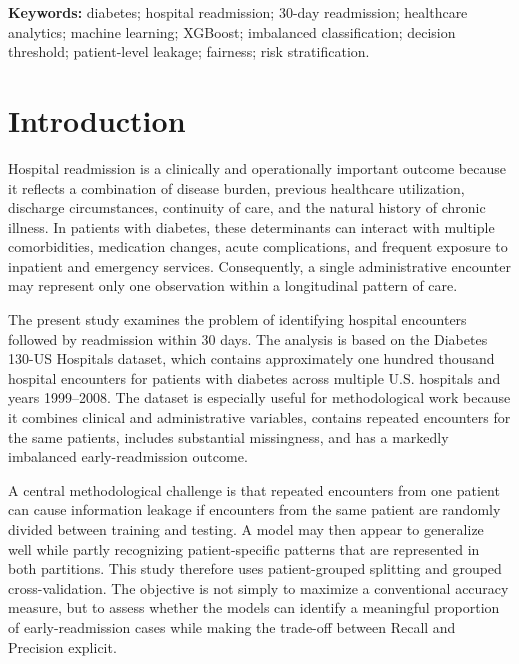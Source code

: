 \documentclass[10pt,a4paper]{article}
\begin{document}
\begin{abstract}
\textbf{Conclusion:} Prior inpatient utilization and discharge disposition were the most consistent predictive signals, while overall discrimination remained modest. The results support use as a human-reviewed risk-stratification aid rather than autonomous clinical decision-making. External and contemporary validation, calibration assessment, uncertainty intervals, and larger subgroup samples are required before clinical deployment.
\end{abstract}

\noindent\textbf{Keywords:} diabetes; hospital readmission; 30-day readmission; healthcare analytics; machine learning; XGBoost; imbalanced classification; decision threshold; patient-level leakage; fairness; risk stratification.

\clearpage
\tableofcontents
\clearpage
\listoffigures
\clearpage
\listoftables
\clearpage
{}

\section{Introduction}

Hospital readmission is a clinically and operationally important outcome because it reflects a combination of disease burden, previous healthcare utilization, discharge circumstances, continuity of care, and the natural history of chronic illness. In patients with diabetes, these determinants can interact with multiple comorbidities, medication changes, acute complications, and frequent exposure to inpatient and emergency services. Consequently, a single administrative encounter may represent only one observation within a longitudinal pattern of care.

The present study examines the problem of identifying hospital encounters followed by readmission within 30 days. The analysis is based on the Diabetes 130-US Hospitals dataset, which contains approximately one hundred thousand hospital encounters for patients with diabetes across multiple U.S. hospitals and years 1999--2008. The dataset is especially useful for methodological work because it combines clinical and administrative variables, contains repeated encounters for the same patients, includes substantial missingness, and has a markedly imbalanced early-readmission outcome.

A central methodological challenge is that repeated encounters from one patient can cause information leakage if encounters from the same patient are randomly divided between training and testing. A model may then appear to generalize well while partly recognizing patient-specific patterns that are represented in both partitions. This study therefore uses patient-grouped splitting and grouped cross-validation. The objective is not simply to maximize a conventional accuracy measure, but to assess whether the models can identify a meaningful proportion of early-readmission cases while making the trade-off between Recall and Precision explicit.
\end{document}
